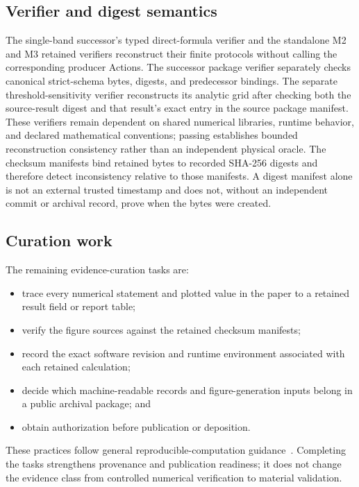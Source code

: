 \subsection{Verifier and digest semantics}

The single-band successor's typed direct-formula verifier and the standalone M2 and
M3 retained verifiers reconstruct their finite protocols without calling the
corresponding producer Actions. The successor package verifier separately checks
canonical strict-schema bytes, digests, and predecessor bindings. The separate
threshold-sensitivity verifier
reconstructs its analytic grid after checking both the source-result digest and
that result's exact entry in the source package manifest. These verifiers
remain dependent on shared numerical libraries, runtime behavior, and declared
mathematical conventions; passing establishes bounded reconstruction
consistency rather than an independent physical oracle.
The checksum manifests bind retained bytes to recorded SHA-256 digests and
therefore detect inconsistency relative to those manifests. A digest manifest
alone is not an external trusted timestamp and does not, without an independent
commit or archival record, prove when the bytes were created.

\subsection{Curation work}

The remaining evidence-curation tasks are:
\begin{itemize}
 \item[$\square$] trace every numerical statement and plotted value in the
 paper to a retained result field or report table;
 \item[$\square$] verify the figure sources against the retained checksum
 manifests;
 \item[$\square$] record the exact software revision and runtime environment
 associated with each retained calculation;
 \item[$\square$] decide which machine-readable records and figure-generation
 inputs belong in a public archival package; and
 \item[$\square$] obtain authorization before publication or deposition.
\end{itemize}
These practices follow general reproducible-computation guidance~\cite{sandve2013}.
Completing the tasks strengthens provenance and publication readiness; it does
not change the evidence class from controlled numerical verification to
material validation.
